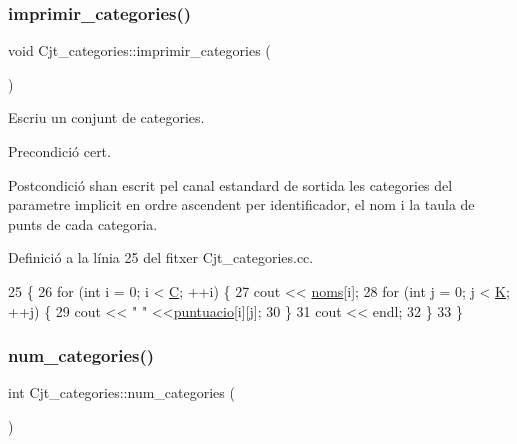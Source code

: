 \subsubsection{\texorpdfstring{imprimir\+\_\+categories()}{imprimir\_categories()}}
{\footnotesize\ttfamily void Cjt\+\_\+categories\+::imprimir\+\_\+categories (\begin{DoxyParamCaption}{ }\end{DoxyParamCaption})}



Escriu un conjunt de categories. 

\begin{DoxyPrecond}{Precondició}
cert. 
\end{DoxyPrecond}
\begin{DoxyPostcond}{Postcondició}
s\textquotesingle{}han escrit pel canal estandard de sortida les categories del parametre implicit en ordre ascendent per identificador, el nom i la taula de punts de cada categoria. 
\end{DoxyPostcond}


Definició a la línia 25 del fitxer Cjt\+\_\+categories.\+cc.


\begin{DoxyCode}
25                                          \{
26     \textcolor{keywordflow}{for} (\textcolor{keywordtype}{int} i = 0; i < \mbox{\hyperlink{class_cjt__categories_a1d3d6eb2bd5a981ca1e56d4d16e7d1c1}{C}}; ++i) \{
27         cout << \mbox{\hyperlink{class_cjt__categories_a45622c30fae365dc72f2d7aa5fbc3bfc}{noms}}[i];
28         \textcolor{keywordflow}{for} (\textcolor{keywordtype}{int} j = 0; j < \mbox{\hyperlink{class_cjt__categories_a3e7981c4f9b0aa3e0d5999ffa291ce54}{K}}; ++j) \{ 
29             cout << \textcolor{stringliteral}{" "} <<\mbox{\hyperlink{class_cjt__categories_a121b331af19b7307f320b21f0edd8b30}{puntuacio}}[i][j];
30         \}
31         cout << endl;
32     \}
33 \}
\end{DoxyCode}
\mbox{\label{class_cjt__categories_a78445bc84e521a95e7314ec4ac2565ad}} 
\subsubsection{\texorpdfstring{num\+\_\+categories()}{num\_categories()}}
{\footnotesize\ttfamily int Cjt\+\_\+categories\+::num\+\_\+categories (\begin{DoxyParamCaption}{ }\end{DoxyParamCaption})}



